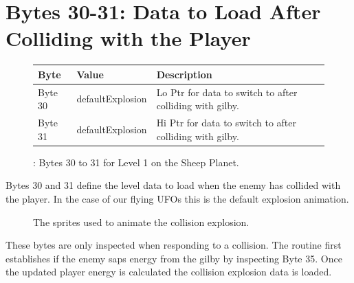 \section{Bytes 30-31: Data to Load After Colliding with the Player}
\begin{figure}[H]

  {
    \setlength{\tabcolsep}{3.0pt}
    \setlength\cmidrulewidth{\heavyrulewidth} %
    \begin{adjustbox}{width=13cm}

      \begin{tabular}{lll}
        \toprule
        Byte    & Value                     & Description                                                        \\
        \midrule
 Byte 30 & defaultExplosion          & Lo Ptr for data to switch to after colliding with gilby.                \\
 Byte 31 & defaultExplosion          & Hi Ptr for data to switch to after colliding with gilby.                \\
        \bottomrule
      \end{tabular}
    \end{adjustbox}
  }\caption{: Bytes 30 to 31 for Level 1 on the Sheep Planet.}
\end{figure}

Bytes 30 and 31 define the level data to load when the enemy has collided with the player. In the case of our
flying UFOs this is the default explosion animation.

\begin{figure}[H]
  {
    \setlength{\tabcolsep}{3.0pt}
    \setlength\cmidrulewidth{\heavyrulewidth} %
	\centering
	\def\MULTICOLORONE{white}
	\def\MULTICOLORTWO{red}
	\def\SPRITECOLOR{c64_darkgray}
	\begin{subfigure}{0.3\textwidth}
		
	\end{subfigure}
	\begin{subfigure}{0.3\textwidth}
		
	\end{subfigure}
	\begin{subfigure}{0.3\textwidth}
		
	\end{subfigure}
  }\caption[position=top]{The sprites used to animate the collision explosion.}
\end{figure}

These bytes are only inspected when responding to a collision. The routine 
first establishes if the enemy saps energy from the gilby by inspecting Byte 35. Once the updated player energy
is calculated the collision explosion data is loaded.

